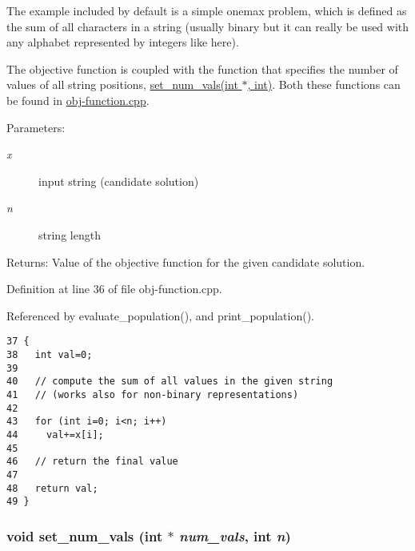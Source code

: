 The example included by default is a simple onemax problem, which is defined as the sum of all characters in a string (usually binary but it can really be used with any alphabet represented by integers like here). 

The objective function is coupled with the function that specifies the number of values of all string positions, \hyperlink{obj-function_8hpp_1f6693b983930dbfe403246098bbd9ef}{set\_\-num\_\-vals(int $\ast$, int)}. Both these functions can be found in \hyperlink{obj-function_8cpp}{obj-function.cpp}.

\begin{Desc}
\item[Parameters:]
\begin{description}
\item[{\em x}]input string (candidate solution) \item[{\em n}]string length\end{description}
\end{Desc}
\begin{Desc}
\item[Returns:]Value of the objective function for the given candidate solution. \end{Desc}


Definition at line 36 of file obj-function.cpp.

Referenced by evaluate\_\-population(), and print\_\-population().

\begin{Code}\begin{verbatim}37 {
38   int val=0;
39 
40   // compute the sum of all values in the given string
41   // (works also for non-binary representations)
42 
43   for (int i=0; i<n; i++)
44     val+=x[i];
45 
46   // return the final value
47   
48   return val;
49 }
\end{verbatim}\end{Code}


\hypertarget{obj-function_8hpp_1f6693b983930dbfe403246098bbd9ef}{
\subsubsection[set\_\-num\_\-vals]{\setlength{\rightskip}{0pt plus 5cm}void set\_\-num\_\-vals (int $\ast$ {\em num\_\-vals}, int {\em n})}}
\label{obj-function_8hpp_1f6693b983930dbfe403246098bbd9ef}


